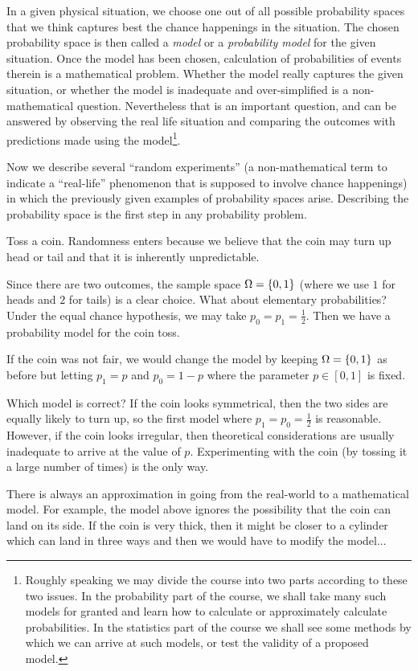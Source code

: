 \documentclass[preprint,  11pt]{amsart}
\def\half{\frac{1}{2}}
\begin{document}
 In a given physical situation, we choose one out of all possible probability spaces that we think captures best the chance happenings in the situation. The chosen probability space is then called a {\em model} or a {\em probability model} for the given situation. Once the model has been chosen, calculation of probabilities of events therein is a mathematical problem. Whether the model really captures the given situation, or whether the model is inadequate and over-simplified is a non-mathematical question. Nevertheless that is an important question, and can be answered by observing the real life situation and comparing the outcomes with predictions made using the model\footnote{Roughly speaking we may divide the course into two parts according to these two issues. In the probability part of the course, we shall take many such models for granted and learn how to calculate or approximately calculate probabilities. In the statistics part of the course we shall see some methods by which we can arrive at such models, or test the validity of a proposed model.}.

 Now we describe several ``random experiments'' (a non-mathematical term to indicate a ``real-life'' phenomenon that is supposed to involve chance happenings) in which the previously given examples of probability spaces arise. Describing the probability space is the first step in any probability problem.
 
\begin{example}  Toss a coin. Randomness enters because we believe that the coin may turn up head or tail and that it is inherently unpredictable. 

 Since there are two outcomes, the sample space $\Omega=\{0,1\}$ (where we use $1$ for heads and $2$ for tails) is a clear choice. What about elementary probabilities? Under the equal chance hypothesis, we may take $p_{0}=p_{1}=\frac{1}{2}$. Then we have a probability model for the coin toss. 

 If the coin was not fair, we would change the model by keeping $\Omega=\{0,1\}$ as before but letting $p_{1}=p$ and $p_{0}=1-p$ where the parameter  $p\in [0,1]$ is fixed. 
 
Which model is correct? If the coin looks  symmetrical, then the two sides are equally likely to turn up, so the first model where $p_{1}=p_{0}=\half$ is reasonable. However, if the coin looks irregular, then theoretical considerations are usually inadequate to arrive at the value of $p$. Experimenting with the coin (by tossing it a large number of times) is the only way. 
 
There is always an approximation in going from the real-world to a mathematical model. For example, the model above ignores the possibility that the coin can land on its side. If the coin is very thick, then it might be closer to a cylinder which can land in three ways and then we would have to modify the model... 
\end{example}
\end{document}
